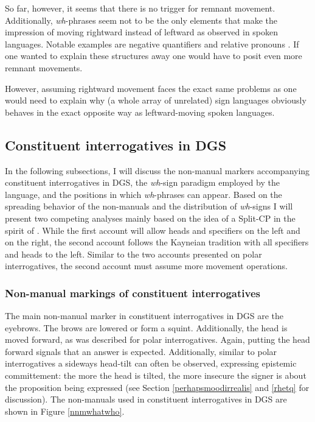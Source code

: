 \noindent So far, however, it seems that there is no trigger for remnant movement. Additionally, \textit{wh}-phrases seem not to be the only elements that make the impression of moving rightward instead of leftward as observed in spoken languages. Notable examples are negative quantifiers and relative pronouns \citep{cecchetto2009another}. If one wanted to explain these structures away one would have to posit even more remnant movements.

However, assuming rightward movement faces the exact same problems as one would need to explain why (a whole array of unrelated) sign languages obviously behaves in the exact opposite way as leftward-moving spoken languages.  

\subsection{Constituent interrogatives in DGS}\label{whinterrogativedgs}


In the following subsections, I will discuss the non-manual markers accompanying constituent interrogatives in DGS, the \textit{wh}-sign paradigm employed by the language, and the positions in which \textit{wh}-phrases can appear. Based on the spreading behavior of the non-manuals and the distribution of \textit{wh}-signs I will present two competing analyses mainly based on the idea of a Split-CP in the spirit of \citet{van2010complex, van2012you}. While the first account will allow heads and specifiers on the left and on the right, the second account follows the Kayneian tradition with all specifiers and heads to the left. Similar to the two accounts presented on polar interrogatives, the second account must assume more movement operations. 

\subsubsection{Non-manual markings of constituent interrogatives}
The main non-manual marker in constituent interrogatives in DGS are the eyebrows. The brows are lowered or form a squint. Additionally, the head is moved forward, as was described for polar interrogatives. Again, putting the head forward signals that an answer is expected. Additionally, similar to polar interrogatives a sideways head-tilt can often be observed, expressing epistemic committement: the more the head is tilted, the more insecure the signer is about the proposition being expressed (see Section \ref{perhapsmoodirrealis} and \ref{rhetq} for discussion). The non-manuals used in constituent interrogatives in DGS are shown in Figure \ref{nnmwhatwho}. 

